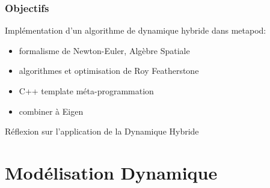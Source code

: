 \documentclass[10pt]{beamer}
\begin{document}
\begin{frame}
  \frametitle{Objectifs}
  
  \begin{block}{Implémentation d'un algorithme de dynamique hybride dans metapod:}
	\begin{itemize}
		\item formalisme de Newton-Euler, Algèbre Spatiale
		\item algorithmes et optimisation de Roy Featherstone
		\item C++ template méta-programmation
		\item combiner à Eigen 
  \end{itemize}
  \end{block}
	
	\bigskip
	\begin{block}{}
	Réflexion sur l'application de la Dynamique Hybride
	\end{block}
	
\end{frame}

\section{Modélisation Dynamique}

\subsection{}
\end{document}
